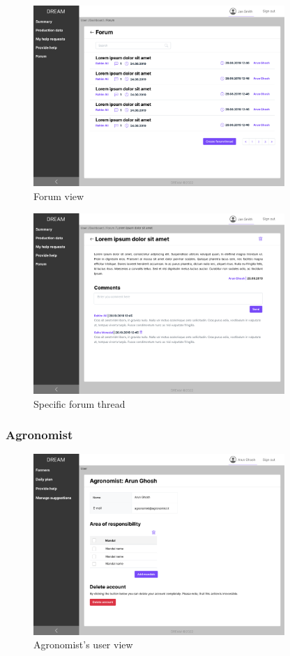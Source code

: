 \begin{figure}[H]
\centering
\includegraphics[width=0.85\textwidth]{mockups/Farmer_Dashboard_Forum.png}
\caption{Forum view}
\end{figure}

\begin{figure}[H]
\centering
\includegraphics[width=0.85\textwidth]{mockups/Farmer_Dashboard_Forum_Thread.png}
\caption{Specific forum thread}
\end{figure}


\subsubsection{Agronomist}

\begin{figure}[H]
\centering
\includegraphics[width=0.85\textwidth]{mockups/Agronomist_User.png}
\caption{Agronomist's user view}
\end{figure}

